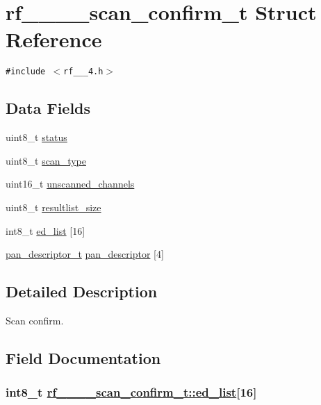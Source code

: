 \hypertarget{structrf__802__15__4__scan__confirm__t}{
\section{rf\_\_\_\_\-scan\_\-confirm\_\-t Struct Reference}
\label{structrf__802__15__4__scan__confirm__t}
}
{\tt \#include $<$rf\_\_\_\-4.h$>$}

\subsection*{Data Fields}
\begin{CompactItemize}
\item 
uint8\_\-t \hyperlink{structrf__802__15__4__scan__confirm__t_0d370206ccff9f39718af8b79650d437}{status}
\item 
uint8\_\-t \hyperlink{structrf__802__15__4__scan__confirm__t_4b7a9839e5e9d6f309257bb0a1f36a5b}{scan\_\-type}
\item 
uint16\_\-t \hyperlink{structrf__802__15__4__scan__confirm__t_72106d46e0d0caf8217fad75c5a15bfc}{unscanned\_\-channels}
\item 
uint8\_\-t \hyperlink{structrf__802__15__4__scan__confirm__t_69e1e9a757f57301370d4e4229aa60da}{resultlist\_\-size}
\item 
int8\_\-t \hyperlink{structrf__802__15__4__scan__confirm__t_7103a6c3f7f6804e8d4764bb8bf7aada}{ed\_\-list} \mbox{[}16\mbox{]}
\item 
\hyperlink{structpan__descriptor__t}{pan\_\-descriptor\_\-t} \hyperlink{structrf__802__15__4__scan__confirm__t_54212a819202dc21a64ea73e630de2bc}{pan\_\-descriptor} \mbox{[}4\mbox{]}
\end{CompactItemize}


\subsection{Detailed Description}
Scan confirm. 



\subsection{Field Documentation}
\hypertarget{structrf__802__15__4__scan__confirm__t_7103a6c3f7f6804e8d4764bb8bf7aada}{
\subsubsection[ed\_\-list]{\setlength{\rightskip}{0pt plus 5cm}int8\_\-t \hyperlink{structrf__802__15__4__scan__confirm__t_7103a6c3f7f6804e8d4764bb8bf7aada}{rf\_\_\_\_\-scan\_\-confirm\_\-t::ed\_\-list}\mbox{[}16\mbox{]}}}
\label{structrf__802__15__4__scan__confirm__t_7103a6c3f7f6804e8d4764bb8bf7aada}


